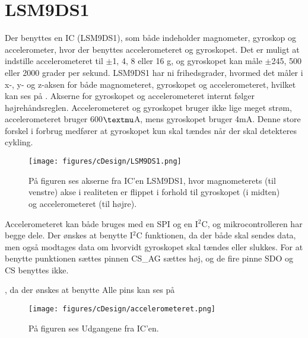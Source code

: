 \section{LSM9DS1}
Der benyttes en IC (LSM9DS1), som både indeholder magnometer, gyroskop og accelerometer, hvor der benyttes accelerometeret og gyroskopet. Det er muligt at indstille accelerometeret til $\pm$1, 4, 8 eller 16 g, og gyroskopet kan måle $\pm$245, 500 eller 2000 grader per sekund.\citep{Jimb02016} \newline
LSM9DS1 har ni frihedsgrader, hvormed det måler i x-, y- og z-aksen for både magnometeret, gyroskopet og accelerometeret, hvilket kan ses på . Akserne for gyroskopet og accelerometeret internt følger højrehåndsreglen.\citep{Jimb02016}\newline
Accelerometeret og gyroskopet bruger ikke lige meget strøm, accelerometeret bruger 600$\textmu$A, mens gyroskopet bruger 4mA. Denne store forskel i forbrug medfører at gyroskopet kun skal tændes når der skal detekteres cykling. 

\begin{figure}[H]
	\centering
	\texttt{[image: figures/cDesign/LSM9DS1.png]}
	\caption{På figuren ses akserne fra IC'en LSM9DS1, hvor magnometerets (til venstre) akse i realiteten er flippet i forhold til gyroskopet (i midten) og accelerometeret (til højre).\citep{Jimb02016}}
	\label{vores_IC}
\end{figure}

Accelerometeret kan både bruges med en SPI og en I$^{2}$C, og mikrocontrolleren har begge dele. Der ønskes at benytte I$^{2}$C funktionen, da der både skal sendes data, men også modtages data om hvorvidt gyroskopet skal tændes eller slukkes. For at benytte punktionen sættes pinnen CS\_AG sættes høj, og de fire pinne SDO og CS benyttes ikke. 

, da der ønskes at benytte  Alle pins kan ses på 

\begin{figure}[H]
	\centering
	\texttt{[image: figures/cDesign/accelerometeret.png]}
	\caption{På figuren ses Udgangene fra IC'en.\citep{Jimb02016}}
	\label{IC_pins}
\end{figure}

